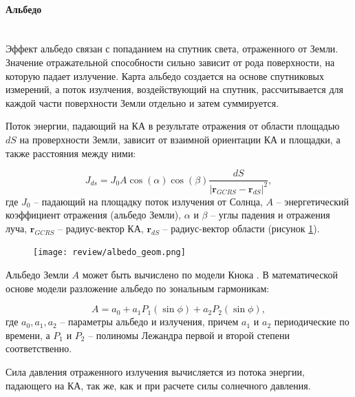 \paragraph{Альбедо} \mbox{} \\

Эффект альбедо связан с попаданием на спутник света, отраженного от Земли.
Значение отражательной способности сильно зависит от рода поверхности, на которую падает излучение.
Карта альбедо создается на основе спутниковых измерений, а поток изулчения,
воздействующий на спутник, рассчитывается для каждой части поверхности Земли отдельно и затем суммируется.

Поток энергии, падающий на КА в результате отражения от области площадью $dS$ на 
проверхности Земли, зависит от взаимной
ориентации КА и площадки, а также расстояния между ними:

\begin{equation*}
    J_{ds} = J_0 A \cos(\alpha) \cos (\beta) 
    \frac{dS}{|\mathbf{r}_{GCRS} - \mathbf{r}_{dS}|^2},
\end{equation*}
где $J_0$ -- падающий на площадку поток излучения от Солнца, 
$A$ -- энергетический коэффициент отражения (альбедо Земли),
$\alpha$ и $\beta$ -- углы падения и отражения луча, 
$\mathbf{r}_{GCRS}$ -- радиус-вектор КА,
$\mathbf{r}_{dS}$ -- радиус-вектор области (рисунок \ref{fig:albedo_geom}).

\begin{figure}[h!]
    \centering
    \texttt{[image: review/albedo\_geom.png]}
    \label{fig:albedo_geom}
\end{figure}

Альбедо Земли $A$ может быть вычислено по модели Кнока \cite{Knocke1988}. В математической основе модели
разложение альбедо по зональным гармоникам:

\begin{equation*}
    A = a_0 + a_1 P_1 (\sin\phi) + a_2 P_2 (\sin \phi),
\end{equation*}
где $a_0, a_1, a_2$ -- параметры альбедо и излучения, причем $a_1$ и $a_2$ периодические по
времени, а $P_1$ и $P_2$ -- полиномы Лежандра первой и второй степени соответственно.

Сила давления отраженного излучения вычисляется из потока энергии, падающего на КА,
так же, как и при расчете силы солнечного давления.



